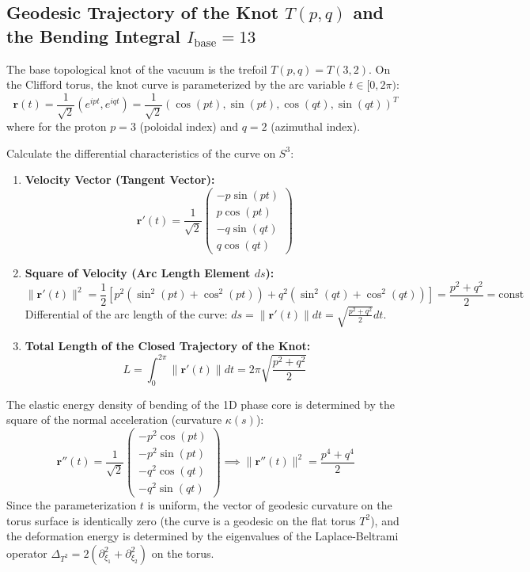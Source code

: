 \documentclass[12pt,a4paper]{article}
\begin{document}
	\subsection{Geodesic Trajectory of the Knot $T(p,q)$ and the Bending Integral $I_{\text{base}} = 13$}
	The base topological knot of the vacuum is the trefoil $T(p,q) = T(3,2)$. On the Clifford torus, the knot curve is parameterized by the arc variable $t \in [0, 2\pi)$:
	\begin{equation}
		\mathbf{r}(t) = \frac{1}{\sqrt{2}} \left( e^{i p t}, e^{i q t} \right) = \frac{1}{\sqrt{2}} \left( \cos(pt), \sin(pt), \cos(qt), \sin(qt) \right)^T
	\end{equation}
	where for the proton $p=3$ (poloidal index) and $q=2$ (azimuthal index).
	
	Calculate the differential characteristics of the curve on $S^3$:
	\begin{enumerate}
		\item \textbf{Velocity Vector (Tangent Vector):}
		\begin{equation}
			\mathbf{r}'(t) = \frac{1}{\sqrt{2}} \begin{pmatrix} -p\sin(pt) \\ p\cos(pt) \\ -q\sin(qt) \\ q\cos(qt) \end{pmatrix}
		\end{equation}
		\item \textbf{Square of Velocity (Arc Length Element $ds$):}
		\begin{equation}
			\|\mathbf{r}'(t)\|^2 = \frac{1}{2} \left[ p^2 (\sin^2(pt) + \cos^2(pt)) + q^2 (\sin^2(qt) + \cos^2(qt)) \right] = \frac{p^2 + q^2}{2} = \text{const}
		\end{equation}
		Differential of the arc length of the curve: $ds = \|\mathbf{r}'(t)\| dt = \sqrt{\frac{p^2 + q^2}{2}} dt$.
		\item \textbf{Total Length of the Closed Trajectory of the Knot:}
		\begin{equation}
			L = \int_0^{2\pi} \|\mathbf{r}'(t)\| dt = 2\pi \sqrt{\frac{p^2 + q^2}{2}}
		\end{equation}
	\end{enumerate}
	
	The elastic energy density of bending of the 1D phase core is determined by the square of the normal acceleration (curvature $\kappa(s)$):
	\begin{equation}
		\mathbf{r}''(t) = \frac{1}{\sqrt{2}} \begin{pmatrix} -p^2\cos(pt) \\ -p^2\sin(pt) \\ -q^2\cos(qt) \\ -q^2\sin(qt) \end{pmatrix} \implies \|\mathbf{r}''(t)\|^2 = \frac{p^4 + q^4}{2}
	\end{equation}
	Since the parameterization $t$ is uniform, the vector of geodesic curvature on the torus surface is identically zero (the curve is a geodesic on the flat torus $T^2$), and the deformation energy is determined by the eigenvalues of the Laplace-Beltrami operator $\Delta_{T^2} = 2 (\partial_{\xi_1}^2 + \partial_{\xi_2}^2)$ on the torus.
	
\end{document}
